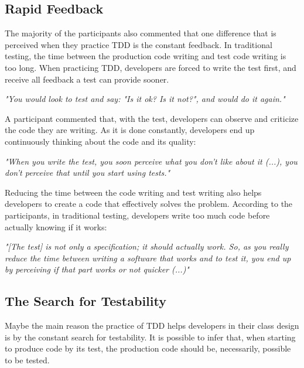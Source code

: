 \documentclass[times]{elsarticle}
\begin{document}
\subsection{Rapid Feedback}

The majority of the participants also commented that one difference that is
perceived when they practice TDD is the constant feedback. In traditional testing,
the time between the production code writing and test code writing is too long.
When practicing TDD, developers are forced to write the test first, and receive all
feedback a test can provide sooner.

\begin{framed}
	\textit{"You would look to test and say: "Is it ok? Is it not?", and would do it again."}
\end{framed}

A participant commented that, with the test, developers can observe
and criticize the code they are writing. As it is done constantly,
developers end up continuously thinking about the code and its
quality:

\begin{framed}
	\textit{"When you write the test, you soon perceive what you don't like about it (...), 
	you don't perceive that until you start using tests."}
\end{framed}

Reducing the time between the code writing and test writing also helps developers to
create a code that effectively solves the problem. According to the participants, in traditional
testing, developers write too much code before actually knowing if it works:

\begin{framed}
	\textit{"[The test] is not only a specification; it should actually work. So, as you really reduce
	the time between writing a software that works and to test it, you end up by perceiving if that
	part works or not quicker (...)"}
\end{framed}

\subsection{The Search for Testability}

Maybe the main reason the practice of TDD helps developers in their class design is
by the constant search for testability. It is possible to infer that,
when starting to produce code by its test, the production code should be, necessarily,
possible to be tested.
\end{document}
